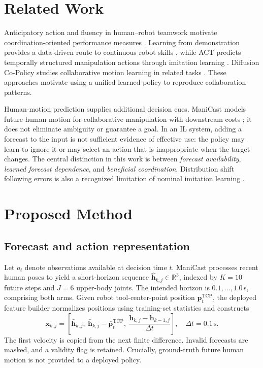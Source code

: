 \documentclass[conference]{IEEEtran}
\begin{document}
\section{Related Work}
Anticipatory action and fluency in human--robot teamwork motivate coordination-oriented performance measures \cite{hoffman2007,hoffman2019}. Learning from demonstration provides a data-driven route to continuous robot skills \cite{argall2009}, while ACT predicts temporally structured manipulation actions through imitation learning \cite{zhao2023}. Diffusion Co-Policy studies collaborative motion learning in related tasks \cite{ng2024}. These approaches motivate using a unified learned policy to reproduce collaboration patterns.

Human-motion prediction supplies additional decision cues. ManiCast models future human motion for collaborative manipulation with downstream costs \cite{kedia2023}; it does not eliminate ambiguity or guarantee a goal. In an IL system, adding a forecast to the input is not sufficient evidence of effective use: the policy may learn to ignore it or may select an action that is inappropriate when the target changes. The central distinction in this work is between \emph{forecast availability}, \emph{learned forecast dependence}, and \emph{beneficial coordination}. Distribution shift following errors is also a recognized limitation of nominal imitation learning \cite{ross2011}.

\section{Proposed Method}
\subsection{Forecast and action representation}
Let $o_t$ denote observations available at decision time $t$. ManiCast processes recent human poses to yield a short-horizon sequence $\hat{\mathbf h}_{k,j}\in\mathbb R^3$, indexed by $K=10$ future steps and $J=6$ upper-body joints. The intended horizon is $0.1,\ldots,1.0$\,s, comprising both arms. Given robot tool-center-point position $\mathbf p_t^{\mathrm{TCP}}$, the deployed feature builder normalizes positions using training-set statistics and constructs
\begin{equation}
\mathbf x_{k,j} =
\left[
\bar{\mathbf h}_{k,j},\
\bar{\mathbf h}_{k,j}-\bar{\mathbf p}^{\mathrm{TCP}}_t,\
\frac{\bar{\mathbf h}_{k,j}-\bar{\mathbf h}_{k-1,j}}{\Delta t}
\right],
\quad \Delta t=0.1\,\mathrm s.
\label{eq:features}
\end{equation}
The first velocity is copied from the next finite difference. Invalid forecasts are masked, and a validity flag is retained. Crucially, ground-truth future human motion is not provided to a deployed policy.
\end{document}

